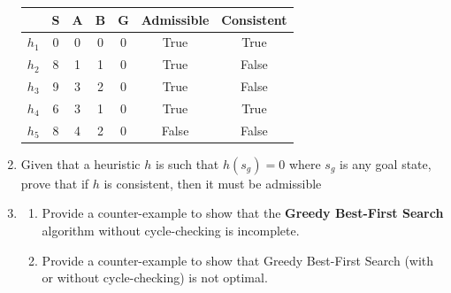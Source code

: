 \begin{enumerate}
\begin{table}[ht!]
        \begin{tabular}{||c|c|c|c|c|c|c||}
            \hline
                  & S & A & B & G & Admissible            & Consistent            \\ \hline \hline
            $h_1$ & 0 & 0 & 0 & 0 & \color{primary} True  & \color{primary} True  \\ \hline
            $h_2$ & 8 & 1 & 1 & 0 & \color{primary} True  & \color{primary} False \\ \hline
            $h_3$ & 9 & 3 & 2 & 0 & \color{primary} True  & \color{primary} False \\ \hline
            $h_4$ & 6 & 3 & 1 & 0 & \color{primary} True  & \color{primary} True  \\ \hline
            $h_5$ & 8 & 4 & 2 & 0 & \color{primary} False & \color{primary} False \\ \hline
        \end{tabular}
    \end{table}

    \item Given that a heuristic $h$ is such that $h(s_g) = 0$ where $s_g$ is any goal state, prove that if $h$ is consistent, then it must be admissible


    \item \begin{enumerate}[label=\alph*)]
        \item Provide a counter-example to show that the \textbf{Greedy Best-First Search} algorithm without cycle-checking is incomplete.

        \begin{solution}
        \end{solution}
        
        \item Provide a counter-example to show that Greedy Best-First Search (with or without cycle-checking) is not optimal.

    \end{enumerate}
\end{enumerate}